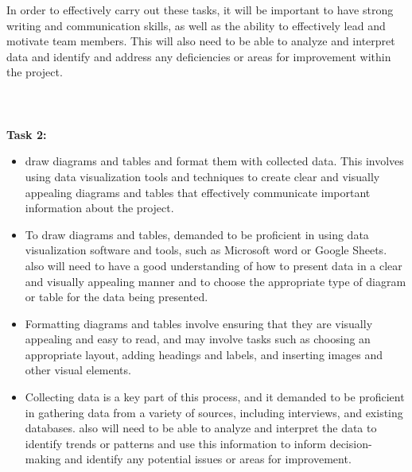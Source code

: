 \documentclass[12pt]{article}
\begin{document}
				In order to effectively carry out these tasks, it will be important to have strong writing and communication skills, as well as the ability to effectively lead and motivate team members. This will also need to be able to analyze and interpret data and identify and address any deficiencies or areas for improvement within the project.\\
				\\
				\\
				\\
				\textbf{Task 2:}
					\begin{itemize}
						\item  draw diagrams and tables and format them with collected data. This involves using data visualization tools and techniques to create clear and visually appealing diagrams and tables that effectively communicate important information about the project.
						\item To draw diagrams and tables, demanded to be proficient in using data visualization software and tools, such as Microsoft word or Google Sheets. also will need to have a good understanding of how to present data in a clear and visually appealing manner and to choose the appropriate type of diagram or table for the data being presented.
						\item Formatting diagrams and tables involve ensuring that they are visually appealing and easy to read, and may involve tasks such as choosing an appropriate layout, adding headings and labels, and inserting images and other visual elements.
						\item Collecting data is a key part of this process, and it demanded to be proficient in gathering data from a variety of sources, including interviews, and existing databases. also will need to be able to analyze and interpret the data to identify trends or patterns and use this information to inform decision-making and identify any potential issues or areas for improvement.
					\end{itemize}
				
\end{document}
